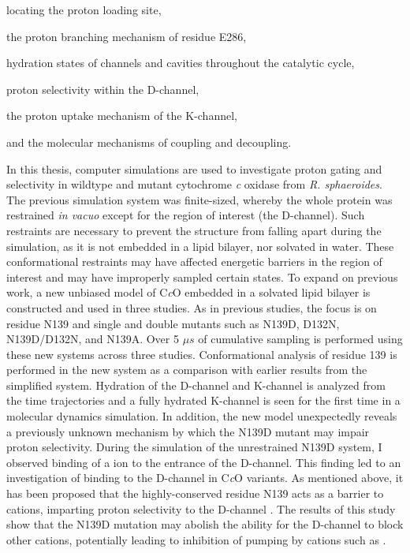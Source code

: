 \begin{itemize}
\begin{singlespaced}    
  \item locating the proton loading site,
  \item the proton branching mechanism of residue E286,
  \item hydration states of channels and cavities throughout the catalytic cycle,
  \item proton selectivity within the D-channel,
  \item the proton uptake mechanism of the K-channel, 
  \item and the molecular mechanisms of coupling and decoupling.
\end{singlespaced}
\end{itemize}

In this thesis, computer simulations are used to investigate proton gating and selectivity in wildtype and mutant cytochrome \emph{c} oxidase from \emph{R. sphaeroides}. The previous simulation system was finite-sized, whereby the whole protein was restrained \emph{in vacuo} except for the region of interest (the D-channel). Such restraints are necessary to prevent the structure from falling apart during the simulation, as it is not embedded in a lipid bilayer, nor solvated in water. These conformational restraints may have affected energetic barriers in the region of interest and may have improperly sampled certain states. To expand on previous work, a new unbiased model of C\emph{c}O embedded in a solvated lipid bilayer is constructed and used in three studies. As in previous studies, the focus is on residue N139 and single and double mutants such as N139D, D132N, N139D/D132N, and N139A. Over 5 $\mu s$ of cumulative sampling is performed using these new systems across three studies. Conformational analysis of residue 139 is performed in the new system as a comparison with earlier results from the simplified system. Hydration of the D-channel and K-channel is analyzed from the time trajectories and a fully hydrated K-channel is seen for the first time in a molecular dynamics simulation. In addition, the new model unexpectedly reveals a previously unknown mechanism by which the N139D mutant may impair proton selectivity. During the simulation of the unrestrained N139D system, I observed binding of a  ion to the entrance of the D-channel. This finding led to an investigation of  binding to the D-channel in C\emph{c}O variants. As mentioned above, it has been proposed that the highly-conserved residue N139 acts as a barrier to cations, imparting proton selectivity to the D-channel \cite{Henry:2009p4543}. The results of this study show that the N139D mutation may abolish the ability for the D-channel to block other cations, potentially leading to inhibition of pumping by cations such as .
